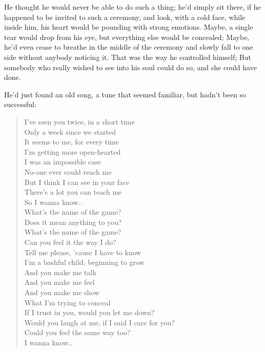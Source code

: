 He thought he would never be able to do such a thing; he'd simply sit there, if he happened to be invited to such a ceremony, and look, with a cold face, while inside him, his heart would be pounding with strong emotions. Maybe, a single tear would drop from his eye, but everything else would be concealed; Maybe, he'd even cease to breathe in the middle of the ceremony and slowly fall to one side without anybody noticing it. That was the way he controlled himself; But somebody who really wished to see into his soul could do so, and she could have done.

He'd just found an old song, a tune that seemed familiar, but hadn't been so successful:
\begin{verse}
I've seen you twice, in a short time \\
Only a week since we started \\
It seems to me, for every time \\
I'm getting more open-hearted \\[1\baselineskip]

I was an impossible case \\
No-one ever could reach me \\
But I think I can see in your face \\
There's a lot you can teach me \\
So I wanna know.. \\[1\baselineskip]

What's the name of the game? \\
Does it mean anything to you? \\
What's the name of the game? \\
Can you feel it the way I do? \\
Tell me please, 'cause I have to know \\
I'm a bashful child, beginning to grow \\[1\baselineskip]

And you make me talk \\
And you make me feel \\
And you make me show \\
What I'm trying to conceal \\
If I trust in you, would you let me down? \\
Would you laugh at me, if I said I care for you? \\
Could you feel the same way too? \\
I wanna know.. \\[1\baselineskip]


\end{verse}

